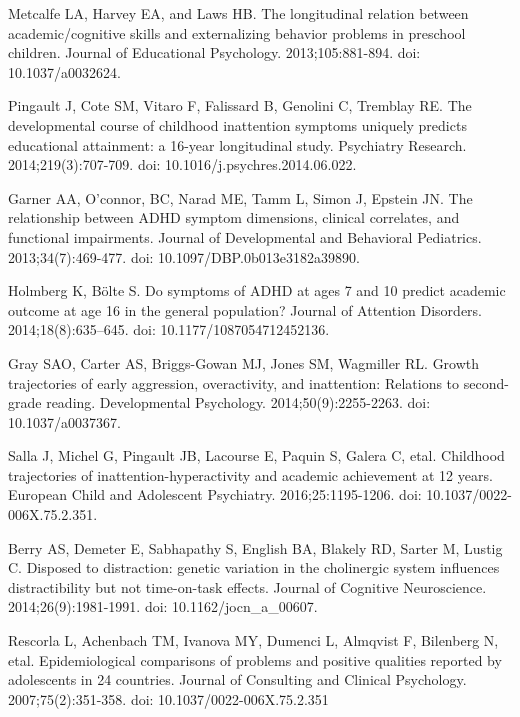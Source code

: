 \documentclass[10pt,letterpaper]{article}
\begin{document}
{\begin{thebibliography}{vancouver.bst}
Metcalfe LA, Harvey EA, and Laws HB.
\newblock The longitudinal relation between academic/cognitive skills and
  externalizing behavior problems in preschool children.
\newblock Journal of Educational Psychology. 2013;105:881-894. doi: 10.1037/a0032624.

Pingault J, Cote SM, Vitaro F, Falissard B, Genolini C, Tremblay RE.
\newblock The developmental course of childhood inattention symptoms uniquely
  predicts educational attainment: a 16-year longitudinal study.
\newblock Psychiatry Research. 2014;219(3):707-709. doi: 10.1016/j.psychres.2014.06.022.

Garner AA, O'connor, BC, Narad ME, Tamm L, Simon J, Epstein JN.
\newblock The relationship between {ADHD} symptom dimensions, clinical
  correlates, and functional impairments.
\newblock Journal of Developmental and Behavioral Pediatrics. 2013;34(7):469-477. doi: 10.1097/DBP.0b013e3182a39890.

Holmberg K, {B\"{o}lte} S.
\newblock Do symptoms of {ADHD} at ages 7 and 10 predict academic outcome at age 16 in the general population?
\newblock Journal of Attention Disorders. 2014;18(8):635--645. doi: 10.1177/1087054712452136.

Gray SAO, Carter AS, Briggs-Gowan MJ, Jones SM, Wagmiller RL.
\newblock Growth trajectories of early aggression, overactivity, and inattention: Relations to second-grade reading.
\newblock Developmental Psychology. 2014;50(9):2255-2263. doi: 10.1037/a0037367. 

Salla J, Michel G, Pingault JB, Lacourse E, 
  Paquin S, Galera C, etal. 
\newblock Childhood trajectories of inattention-hyperactivity and academic
  achievement at 12 years.
\newblock European Child and Adolescent Psychiatry. 2016;25:1195-1206. doi: 10.1037/0022-006X.75.2.351.

Berry AS, Demeter E, Sabhapathy S, English BA,
  Blakely RD, Sarter M, Lustig C.
\newblock Disposed to distraction: genetic variation in the cholinergic system
  influences distractibility but not time-on-task effects.
\newblock Journal of Cognitive Neuroscience. 2014;26(9):1981-1991.  doi: 10.1162/jocn\_a\_00607.

Rescorla L, Achenbach TM, Ivanova MY, Dumenci L, 
  Almqvist F, Bilenberg N, etal. 
\newblock Epidemiological comparisons of problems and positive qualities
  reported by adolescents in 24 countries.
\newblock Journal of Consulting and Clinical Psychology. 2007;75(2):351-358. doi: 10.1037/0022-006X.75.2.351


\end{thebibliography}}
\end{document}
